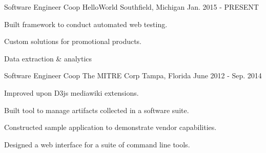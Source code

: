 

\begin{cventries}

  \cventry
    {Software Engineer Coop} %
    {HelloWorld} %
    {Southfield, Michigan} %
    {Jan. 2015 - PRESENT} %
    {
      \begin{cvitems} %
        \item {Built framework to conduct automated web testing.}
        \item {Custom solutions for promotional products.}
        \item {Data extraction \& analytics}
      \end{cvitems}
    }

  \cventry
    {Software Engineer Coop} %
    {The MITRE Corp} %
    {Tampa, Florida} %
    {June 2012 - Sep. 2014} %
    {
      \begin{cvitems} %
        \item {Improved upon D3js mediawiki extensions.}
        \item {Built tool to manage artifacts collected in a software suite.}
        \item {Constructed sample application to demonstrate vendor capabilities.}
        \item {Designed a web interface for a suite of command line tools.}
      \end{cvitems}
    }

\end{cventries}
